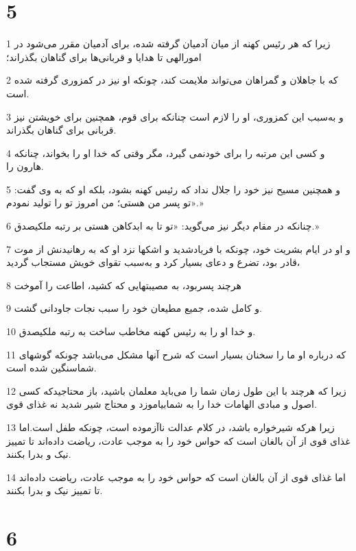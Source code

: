 \chapter{5}

\par 1 زیرا که هر رئیس کهنه از میان آدمیان گرفته شده، برای آدمیان مقرر می‌شود در امورالهی تا هدایا و قربانی‌ها برای گناهان بگذراند؛
\par 2 که با جاهلان و گمراهان می‌تواند ملایمت کند، چونکه او نیز در کمزوری گرفته شده است.
\par 3 و به‌سبب این کمزوری، او را لازم است چنانکه برای قوم، همچنین برای خویشتن نیز قربانی برای گناهان بگذراند.
\par 4 و کسی این مرتبه را برای خودنمی گیرد، مگر وقتی که خدا او را بخواند، چنانکه هارون را.
\par 5 و همچنین مسیح نیز خود را جلال نداد که رئیس کهنه بشود، بلکه او که به وی گفت: «تو پسر من هستی؛ من امروز تو را تولید نمودم.»
\par 6 چنانکه در مقام دیگر نیز می‌گوید: «تو تا به ابدکاهن هستی بر رتبه ملکیصدق.»
\par 7 و او در ایام بشریت خود، چونکه با فریادشدید و اشکها نزد او که به رهانیدنش از موت قادر بود، تضرع و دعای بسیار کرد و به‌سبب تقوای خویش مستجاب گردید،
\par 8 هر‌چند پسربود، به مصیبتهایی که کشید، اطاعت را آموخت
\par 9 و کامل شده، جمیع مطیعان خود را سبب نجات جاودانی گشت.
\par 10 و خدا او را به رئیس کهنه مخاطب ساخت به رتبه ملکیصدق.
\par 11 که درباره او ما را سخنان بسیار است که شرح آنها مشکل می‌باشد چونکه گوشهای شماسنگین شده است.
\par 12 زیرا که هر‌چند با این طول زمان شما را می‌باید معلمان باشید، باز محتاجیدکه کسی اصول و مبادی الهامات خدا را به شمابیاموزد و محتاج شیر شدید نه غذای قوی.
\par 13 زیرا هر‌که شیرخواره باشد، در کلام عدالت ناآزموده است، چونکه طفل است.اما غذای قوی از آن بالغان است که حواس خود را به موجب عادت، ریاضت داده‌اند تا تمییز نیک و بدرا بکنند.
\par 14 اما غذای قوی از آن بالغان است که حواس خود را به موجب عادت، ریاضت داده‌اند تا تمییز نیک و بدرا بکنند.

\chapter{6}

